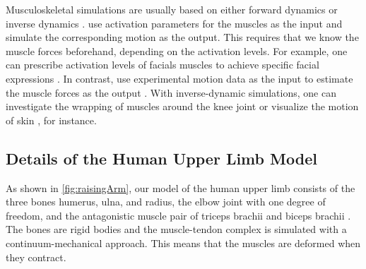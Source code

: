 Musculoskeletal simulations are usually based on
either forward dynamics or inverse dynamics \cite{Valentin18Gradient}.
 use activation parameters
for the muscles as the input and simulate the corresponding motion
as the output.
This requires that we know the muscle forces beforehand,
depending on the activation levels.
For example, one can prescribe activation levels of facials muscles
to achieve specific facial expressions \cite{Wu13Modelling}.
In contrast, 
use experimental motion data as the input
to estimate the muscle forces as the output \cite{Roehrle16Two}.
With inverse-dynamic simulations,
one can investigate the wrapping of muscles
around the knee joint \cite{Fernandez05Anatomically} or
visualize the motion of skin \cite{Lee09Comprehensive}, for instance.



\subsection{Details of the Human Upper Limb Model}
\label{sec:712details}


As shown in \cref{fig:raisingArm},
our model of the human upper limb consists
of the three bones humerus, ulna, and radius,
the elbow joint with one degree of freedom, and
the antagonistic muscle pair of triceps brachii and biceps brachii
\cite{Valentin18Gradient}.
The bones are rigid bodies and the muscle-tendon complex
is simulated with a continuum-mechanical approach.
This means that the muscles are deformed when they contract.

